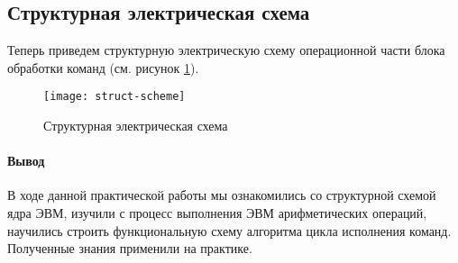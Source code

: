 \documentclass[a4paper,14pt]{extarticle}
\begin{document}
\subsection*{Структурная электрическая схема}

Теперь приведем структурную электрическую схему операционной
части блока обработки команд (см. рисунок \ref{fig:struct-scheme}).

\begin{figure}[h!]
	\centering
	\texttt{[image: struct-scheme]}
	\caption{Структурная электрическая схема}
	\label{fig:struct-scheme}
\end{figure}


\newpage
\paragraph{Вывод}

В ходе данной практической работы мы ознакомились со структурной
схемой ядра ЭВМ, изучили с процесс выполнения ЭВМ арифметических
операций, научились строить функциональную схему алгоритма цикла
исполнения команд. Полученные знания применили на практике.
\end{document}
